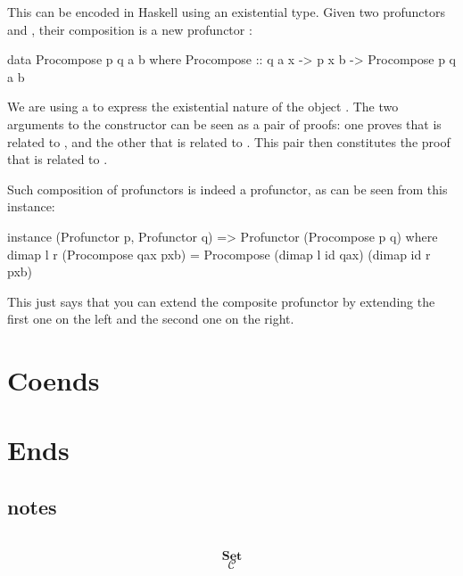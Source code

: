 \documentclass[DaoFP]{subfiles}
\begin{document}
This can be encoded in Haskell using an existential type. Given two profunctors  and , their composition is a new profunctor :
\begin{haskell}
data Procompose p q a b where
  Procompose ::  q a x -> p x b -> Procompose p q a b
\end{haskell}
We are using a  to express the existential nature of the object . The two arguments to the constructor can be seen as a pair of proofs: one proves that  is related to , and the other that  is related to . This pair then constitutes the proof that  is related to .

Such composition of profunctors is indeed a profunctor, as can be seen from this instance:
\begin{haskell}
instance (Profunctor p, Profunctor q) => Profunctor (Procompose p q) 
  where
    dimap l r (Procompose qax pxb) = 
               Procompose (dimap l id qax) (dimap id r pxb)
\end{haskell}
This just says that you can extend the composite profunctor by extending the first one on the left and the second one on the right.



\section{Coends}

\section{Ends}

\subsection{notes}

\begin{exercise}
\end{exercise}

\begin{haskell}
\end{haskell}

\[
 \begin{tikzcd}
  \end{tikzcd}
\]

\[   \mathbf{Set} \]
\[   \mathcal{C} \]
\end{document}

